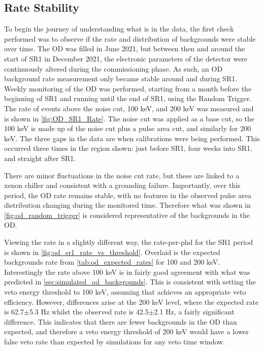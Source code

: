 \subsection{Rate Stability}
\par
To begin the journey of understanding what is in the data, the first check performed was to observe if the rate and distribution of backgrounds were stable over time.
The OD was filled in June 2021, but between then and around the start of SR1 in December 2021, the electronic parameters of the detector were continuously altered during the commissioning phase.
As such, an OD background rate measurement only became stable around and during SR1.
Weekly monitoring of the OD was performed, starting from a month before the beginning of SR1 and running until the end of SR1, using the Random Trigger.
The rate of events above the noise cut, 100 keV, and 200 keV was measured and is shown in \autoref{fig:OD_SR1_Rate}.
The noise cut was applied as a base cut, so the 100 keV is made up of the noise cut plus a pulse area cut, and similarly for 200 keV.
The three gaps in the data are when calibrations were being performed.
This occurred three times in the region shown: just before SR1, four weeks into SR1, and straight after SR1.
\par
There are minor fluctuations in the noise cut rate, but these are linked to a xenon chiller and consistent with a grounding failure.
Importantly, over this period, the OD rate remains stable, with no features in the observed pulse area distribution changing during the monitored time.
Therefore what was shown in \autoref{fig:od_random_trigger} is considered representative of the backgrounds in the OD.
\par
Viewing the rate in a slightly different way, the rate-per-phd for the SR1 period is shown in \autoref{fig:od_sr1_rate_vs_threshold}.
Overlaid is the expected backgrounds rate from \autoref{tab:od_expected_rates} for 100 and 200 keV.
Interestingly the rate above 100 keV is in fairly good agreement with what was predicted in \autoref{sec:simulated_od_backgrounds}.
This is consistent with setting the veto energy threshold to 100 keV, assuming that achieves an appropriate veto efficiency.
However, differences arise at the 200 keV level, where the expected rate is 62.7$\pm$5.3 Hz whilst the observed rate is 42.5$\pm$2.1 Hz, a fairly significant difference.
This indicates that there are fewer backgrounds in the OD than expected, and therefore a veto energy threshold of 200 keV would have a lower false veto rate than expected by simulations for any veto time window.

